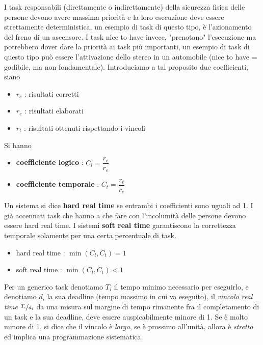 \documentclass[10pt, letterpaper]{report}
\begin{document}
I task responsabili (direttamente o indirettamente) della sicurezza fisica delle persone devono avere 
massima priorità e la loro esecuzione deve essere strettamente deterministica, un esempio di task di questo tipo, 
è l'azionamento del freno di un ascensore. I task nice to have invece, "prenotano" l'esecuzione ma potrebbero 
dover dare la priorità ai task più importanti, un esempio di task di questo tipo può essere l'attivazione 
dello stereo in un automobile (nice to have = godibile, ma non fondamentale).\acc 
Introduciamo a tal proposito due coefficienti, siano \begin{itemize}
    \item $r_c$ : risultati corretti 
    \item $r_e$ : risultati elaborati 
    \item $r_t$ : risultati ottenuti rispettando i vincoli \end{itemize}Si hanno\begin{itemize}
    \item \textbf{coefficiente logico} : $C_l=\dfrac{r_c}{r_e}$
    \item  \textbf{coefficiente temporale} : $C_t=\dfrac{r_t}{r_e}$
\end{itemize}
Un sistema si dice \textbf{hard real time} se entrambi i coefficienti sono uguali ad 1. I già accennati task 
che hanno a che fare con l'incolumità delle persone devono essere hard real time. I sistemi \textbf{soft real time} 
garantiscono la correttezza temporale solamente per una certa percentuale di task. 
\begin{itemize}
    \item hard real time  : $\min(C_l,C_t)=1$ 
    \item soft real time :  $\min(C_l,C_t)<1$
\end{itemize}
Per un generico task denotiamo $T_i$ il tempo minimo necessario per eseguirlo, e denotiamo $d_i$ la 
sua deadline (tempo massimo in cui va eseguito), il \textit{vincolo real time} $\nicefrac{T_i}{d_i}$
da una misura sul margine di tempo rimanente fra il completamento di un task e la sua deadline, deve essere 
auspicabilmente minore di 1. Se è molto minore di 1, si dice che il vincolo è \textit{largo}, se è prossimo all'unità, 
allora è \textit{stretto} ed implica una programmazione sistematica.\flowerLine 
\end{document}
